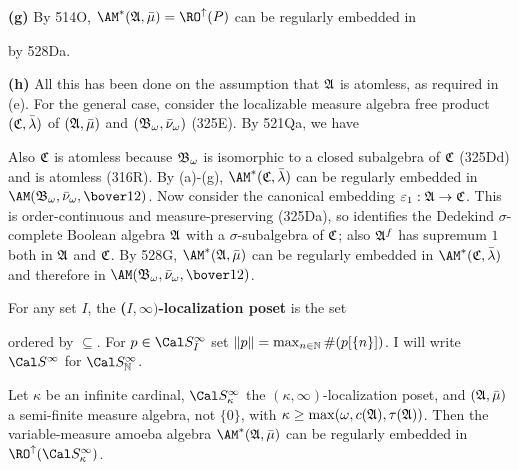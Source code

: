 {\medskip

{\bf (g)} By 514O, $\AM^*(\frak A,\bar\mu)=\RO^{\uparrow}(P)$ can be
regularly embedded in


\noindent by 528Da.

\medskip

{\bf (h)} All this has been done on the assumption that $\frak A$ is
atomless, as required in (e).   For the general case, consider the
localizable measure algebra free product
$(\frak C,\bar\lambda)$ of $(\frak A,\bar\mu)$ and
$(\frak B_{\omega},\bar\nu_{\omega})$ (325E).   By 521Qa, we have


\noindent Also $\frak C$ is atomless because $\frak B_{\omega}$ is
isomorphic to a closed subalgebra of $\frak C$ (325Dd) and is atomless
(316R).
By (a)-(g), $\AM^*(\frak C,\bar\lambda)$ can be regularly embedded in
$\AM(\frak B_{\omega},\bar\nu_{\omega},\bover12)$.   Now consider the
canonical embedding $\varepsilon_1:\frak A\to\frak C$.
This is order-continuous and measure-preserving (325Da), so identifies the
Dedekind $\sigma$-complete Boolean algebra $\frak A$ with a
$\sigma$-subalgebra of $\frak C$;  also $\frak A^f$ has supremum $1$ both
in $\frak A$ and $\frak C$.   By 528G, $\AM^*(\frak A,\bar\mu)$ can be
regularly embedded in $\AM^*(\frak C,\bar\lambda)$ and therefore in
$\AM(\frak B_{\omega},\bar\nu_{\omega},\bover12)$.
}%

 For any set $I$, the
{\bf ($I,\infty)$-localization poset} is the set


\noindent ordered by $\subseteq$.   For $p\in\Cal S_I^{\infty}$ set
$\|p\|=\max_{n\in\Bbb N}\#(p[\{n\}])$.    I will write $\Cal S^{\infty}$
for $\Cal S^{\infty}_{\Bbb N}$.

 Let $\kappa$ be an infinite cardinal,
$\Cal S_{\kappa}^{\infty}$ the $(\kappa,\infty)$-localization poset,
and $(\frak A,\bar\mu)$ a
semi-finite measure algebra, not $\{0\}$, with
$\kappa\ge\max(\omega,c(\frak A),\tau(\frak A))$.
Then the variable-measure amoeba algebra
$\AM^*(\frak A,\bar\mu)$ can be regularly embedded in
$\RO^{\uparrow}(\Cal S_{\kappa}^{\infty})$.

